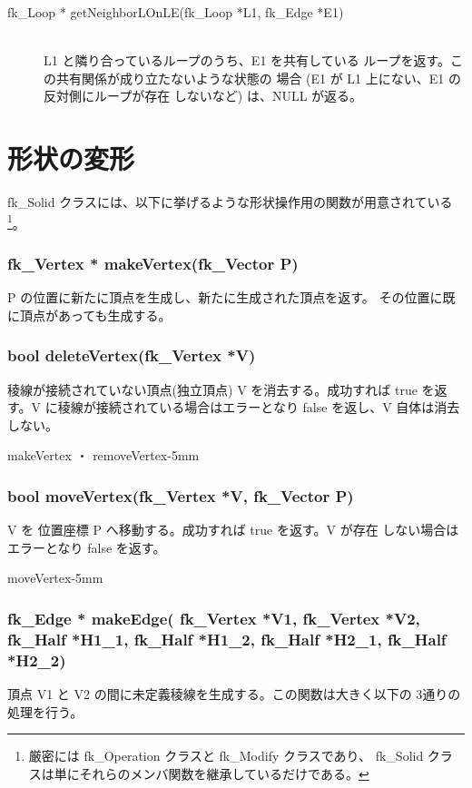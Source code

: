 \begin{description}
 \item[\hspace*{0.6cm}fk\_Loop *
	getNeighborLOnLE(fk\_Loop *L1, fk\_Edge *E1)] ~ \\
	L1 と隣り合っているループのうち、E1 を共有している
	ループを返す。この共有関係が成り立たないような状態の
	場合 (E1 が L1 上にない、E1 の反対側にループが存在
	しないなど) は、NULL が返る。
\end{description}

\section{形状の変形} \label{sec:ModifySolid}
fk\_Solid クラスには、以下に挙げるような形状操作用の関数が用意されている
\footnote{厳密には fk\_Operation クラスと fk\_Modify クラスであり、
fk\_Solid クラスは単にそれらのメンバ関数を継承しているだけである。}。
 \subsubsection*{\hspace*{0.6cm}fk\_Vertex * makeVertex(fk\_Vector P)}
	P の位置に新たに頂点を生成し、新たに生成された頂点を返す。
	その位置に既に頂点があっても生成する。

 \subsubsection*{\hspace*{0.6cm}bool deleteVertex(fk\_Vertex *V)}
   	稜線が接続されていない頂点(独立頂点) V を消去する。成功すれば
	true を返す。V に稜線が接続されている場合はエラーとなり false
	を返し、V 自体は消去しない。

	{makeVertex ・ removeVertex}{-5mm}

 \subsubsection*{\hspace*{0.6cm}bool moveVertex(fk\_Vertex *V, fk\_Vector P)}
	V を 位置座標 P へ移動する。成功すれば true を返す。V が存在
	しない場合はエラーとなり false を返す。

	{moveVertex}{-5mm}

 \subsubsection*{\hspace*{0.6cm}fk\_Edge * makeEdge(
	fk\_Vertex *V1, fk\_Vertex *V2, \\ \hspace*{4.4cm}
	fk\_Half *H1\_1, fk\_Half *H1\_2,
	fk\_Half *H2\_1, fk\_Half *H2\_2)}
	頂点 V1 と V2 の間に未定義稜線を生成する。この関数は大きく以下の
	3通りの処理を行う。

